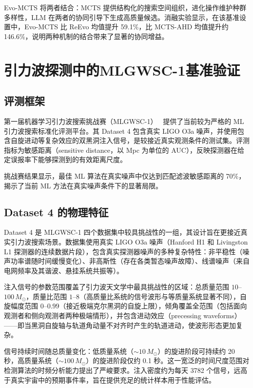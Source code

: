 Evo-MCTS 将两者结合：MCTS 提供结构化的搜索空间组织，进化操作维护种群多样性，LLM 在两者的协同引导下生成高质量候选。消融实验显示，在该基准设置中，Evo-MCTS 比 ReEvo 均值提升 59.1\%，比 MCTS-AHD 均值提升约 146.6\%，说明两种机制的结合带来了显著的协同增益。

\section{引力波探测中的MLGWSC-1基准验证}

\subsection{评测框架}

第一届机器学习引力波搜索挑战赛（MLGWSC-1）~\cite{schafer2023mlgwsc1} 提供了当前较为严格的 ML 引力波搜索标准化评测平台。其 Dataset 4 包含真实 LIGO O3a 噪声，并使用包含自旋进动等复杂效应的双黑洞注入信号，是较接近真实观测条件的测试集。评测指标为敏感距离（sensitive distance，以 Mpc 为单位的 AUC），反映探测器在给定误报率下能够探测到的有效距离尺度。

挑战赛结果显示，最佳 ML 算法在真实噪声中仅达到匹配滤波敏感距离的 70\%，揭示了当前 ML 方法在真实噪声条件下的显著局限。

\subsection{Dataset 4 的物理特征}

Dataset 4 是 MLGWSC-1 四个数据集中较具挑战性的一组，其设计旨在更接近真实引力波搜索场景。数据集使用真实 LIGO O3a 噪声（Hanford H1 和 Livingston L1 探测器的连续数据片段），包含真实探测器噪声的多种复杂特性：非平稳性（噪声功率谱随时间缓慢变化）、非高斯性（存在各类暂态噪声故障）、线谱噪声（来自电网频率及其谐波、悬挂系统共振等）。

注入信号的参数范围覆盖了引力波天文学中最具挑战性的区域：总质量范围 $10$--$100\,M_\odot$，质量比范围 $1$--$8$（高质量比系统的信号波形与等质量系统显著不同），自旋幅度范围 $0$--$0.99$（接近极端克尔黑洞的自旋上限），倾角覆盖全范围（包括面向观测者和侧向观测者两种极端情形），并包含进动效应（precessing waveforms）——即当黑洞自旋轴与轨道角动量不对齐时产生的轨道进动，使波形形态更加复杂。

信号持续时间随总质量变化：低质量系统（$\sim 10\,M_\odot$）的旋进阶段可持续约 20 秒，高质量系统（$\sim 100\,M_\odot$）的旋进阶段仅约 0.1 秒。这一宽泛的时间尺度范围对检测算法的时频分析能力提出了严峻要求。注入密度约为每天 3782 个信号，远高于真实宇宙中的预期事件率，旨在提供充足的统计样本用于性能评估。

